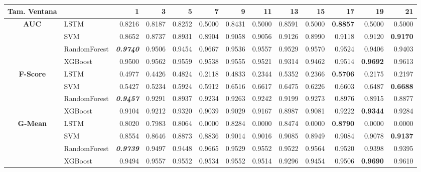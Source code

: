 \begin{table}[H]
	\centering
	\begin{adjustbox}{max width=12cm}
		\begin{tabular}{|c|l|r|r|r|r|r|r|r|r|r|r|r|}
			\hline
			\textbf{Tam. Ventana}&         &      1  &      3  &      5  &      7  &      9  &      11 &      13 &      15 &      17 &      19 &      21 \\
			\hline
			\textbf{AUC} &  LSTM &  0.8216 &  0.8187 &  0.8252 &  0.5000 &  0.8431 &  0.5000 &  0.8591 &  0.5000 & \textbf{  0.8857 } &  0.5000 &  0.5000 \\
			&  SVM &  0.8652 &  0.8737 &  0.8931 &  0.8904 &  0.9058 &  0.9056 &  0.9126 &  0.8990 &  0.9118 &  0.9120 & \textbf{  0.9170 } \\
			&  RandomForest & \textit{ \textbf{  0.9740 } } &  0.9506 &  0.9454 &  0.9667 &  0.9536 &  0.9557 &  0.9529 &  0.9570 &  0.9524 &  0.9406 &  0.9403 \\
			&  XGBoost &  0.9500 &  0.9562 &  0.9559 &  0.9538 &  0.9555 &  0.9521 &  0.9314 &  0.9462 &  0.9514 & \textbf{  0.9692 } &  0.9613 \\
			\hline
			\textbf{F-Score} &  LSTM &  0.4977 &  0.4426 &  0.4824 &  0.2118 &  0.4833 &  0.2344 &  0.5352 &  0.2366 & \textbf{  0.5706 } &  0.2175 &  0.2197 \\
			&  SVM &  0.5427 &  0.5234 &  0.5924 &  0.5912 &  0.6516 &  0.6617 &  0.6475 &  0.6226 &  0.6603 &  0.6487 & \textbf{  0.6688 } \\
			&  RandomForest & \textit{ \textbf{  0.9457 } } &  0.9291 &  0.8937 &  0.9234 &  0.9263 &  0.9242 &  0.9199 &  0.9273 &  0.8976 &  0.8915 &  0.8877 \\
			&  XGBoost &  0.9104 &  0.9212 &  0.9320 &  0.9039 &  0.9029 &  0.9167 &  0.8987 &  0.9081 &  0.9222 & \textbf{  0.9344 } &  0.9284 \\
			\hline
			\textbf{G-Mean} &  LSTM &  0.8020 &  0.7983 &  0.8064 &  0.0000 &  0.8284 &  0.0000 &  0.8474 &  0.0000 & \textbf{  0.8790 } &  0.0000 &  0.0000 \\
			&  SVM &  0.8554 &  0.8646 &  0.8873 &  0.8836 &  0.9014 &  0.9016 &  0.9085 &  0.8949 &  0.9084 &  0.9078 & \textbf{  0.9137 } \\
			&  RandomForest & \textit{ \textbf{  0.9739 } } &  0.9497 &  0.9448 &  0.9665 &  0.9529 &  0.9552 &  0.9522 &  0.9564 &  0.9520 &  0.9398 &  0.9395 \\
			&  XGBoost &  0.9494 &  0.9557 &  0.9552 &  0.9534 &  0.9552 &  0.9514 &  0.9296 &  0.9454 &  0.9506 & \textbf{  0.9690 } &  0.9610 \\

\end{tabular}
\end{adjustbox}
\end{table}
